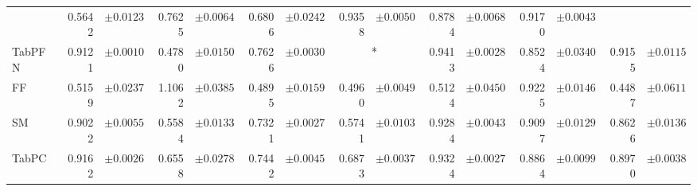 \begin{table}[htbp]
{\begin{tabular}{
l
r@{}l
r@{}l
r@{}l
r@{}l
r@{}l
r@{}l
r@{}l
}
 & 0.5642 & \footnotesize{$\pm 0.0123$}
 & 0.7625 & \footnotesize{$\pm 0.0064$}
 & 0.6806 & \footnotesize{$\pm 0.0242$}
 & 0.9358 & \footnotesize{$\pm 0.0050$}
 & 0.8784 & \footnotesize{$\pm 0.0068$}
 & 0.9170 & \footnotesize{$\pm 0.0043$}
 \\
    TabPFN & 0.9121 & \footnotesize{$\pm 0.0010$}
 & 0.4780 & \footnotesize{$\pm 0.0150$}
 & 0.7626 & \footnotesize{$\pm 0.0030$}
 & \multicolumn{2}{c}{*} & 0.9413 & \footnotesize{$\pm 0.0028$}
 & 0.8524 & \footnotesize{$\pm 0.0340$}
 & 0.9155 & \footnotesize{$\pm 0.0115$}
 \\
    \midrule
    FF & 0.5159 & \footnotesize{$\pm 0.0237$}
 & 1.1062 & \footnotesize{$\pm 0.0385$}
 & 0.4895 & \footnotesize{$\pm 0.0159$}
 & 0.4960 & \footnotesize{$\pm 0.0049$}
 & 0.5124 & \footnotesize{$\pm 0.0450$}
 & 0.9225 & \footnotesize{$\pm 0.0146$}
 & 0.4487 & \footnotesize{$\pm 0.0611$}
 \\
    SM & 0.9022 & \footnotesize{$\pm 0.0055$}
 & 0.5584 & \footnotesize{$\pm 0.0133$}
 & 0.7321 & \footnotesize{$\pm 0.0027$}
 & 0.5741 & \footnotesize{$\pm 0.0103$}
 & 0.9284 & \footnotesize{$\pm 0.0043$}
 & 0.9097 & \footnotesize{$\pm 0.0129$}
 & 0.8626 & \footnotesize{$\pm 0.0136$}
 \\
    TabPC & 0.9162 & \footnotesize{$\pm 0.0026$}
 & 0.6558 & \footnotesize{$\pm 0.0278$}
 & 0.7442 & \footnotesize{$\pm 0.0045$}
 & 0.6873 & \footnotesize{$\pm 0.0037$}
 & 0.9324 & \footnotesize{$\pm 0.0027$}
 & 0.8864 & \footnotesize{$\pm 0.0099$}
 & 0.8970 & \footnotesize{$\pm 0.0038$}
 \\
    \bottomrule[1.0pt]
\end{tabular}}
\end{table}
